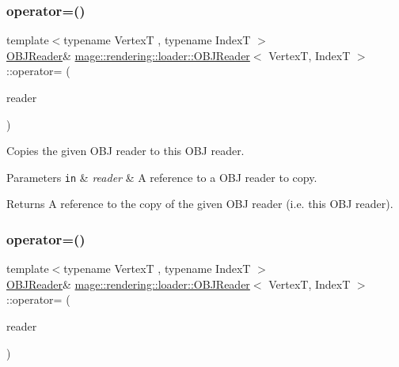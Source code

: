 \subsubsection{\texorpdfstring{operator=()}{operator=()}\hspace{0.1cm}{\footnotesize\ttfamily [1/2]}}
{\footnotesize\ttfamily template$<$typename VertexT , typename IndexT $>$ \\
\hyperlink{classmage_1_1rendering_1_1loader_1_1_o_b_j_reader}{O\+B\+J\+Reader}\& \hyperlink{classmage_1_1rendering_1_1loader_1_1_o_b_j_reader}{mage\+::rendering\+::loader\+::\+O\+B\+J\+Reader}$<$ VertexT, IndexT $>$\+::operator= (\begin{DoxyParamCaption}\item[{const \hyperlink{classmage_1_1rendering_1_1loader_1_1_o_b_j_reader}{O\+B\+J\+Reader}$<$ VertexT, IndexT $>$ \&}]{reader }\end{DoxyParamCaption})\hspace{0.3cm}{\ttfamily [delete]}}

Copies the given O\+BJ reader to this O\+BJ reader.


\begin{DoxyParams}[1]{Parameters}
\mbox{\tt in}  & {\em reader} & A reference to a O\+BJ reader to copy. \\
\hline
\end{DoxyParams}
\begin{DoxyReturn}{Returns}
A reference to the copy of the given O\+BJ reader (i.\+e. this O\+BJ reader). 
\end{DoxyReturn}
\hypertarget{classmage_1_1rendering_1_1loader_1_1_o_b_j_reader_ad35fe46e20179ce1cd79386501ee0959}{}\label{classmage_1_1rendering_1_1loader_1_1_o_b_j_reader_ad35fe46e20179ce1cd79386501ee0959} 
\subsubsection{\texorpdfstring{operator=()}{operator=()}\hspace{0.1cm}{\footnotesize\ttfamily [2/2]}}
{\footnotesize\ttfamily template$<$typename VertexT , typename IndexT $>$ \\
\hyperlink{classmage_1_1rendering_1_1loader_1_1_o_b_j_reader}{O\+B\+J\+Reader}\& \hyperlink{classmage_1_1rendering_1_1loader_1_1_o_b_j_reader}{mage\+::rendering\+::loader\+::\+O\+B\+J\+Reader}$<$ VertexT, IndexT $>$\+::operator= (\begin{DoxyParamCaption}\item[{\hyperlink{classmage_1_1rendering_1_1loader_1_1_o_b_j_reader}{O\+B\+J\+Reader}$<$ VertexT, IndexT $>$ \&\&}]{reader }\end{DoxyParamCaption})\hspace{0.3cm}{\ttfamily [delete]}}

